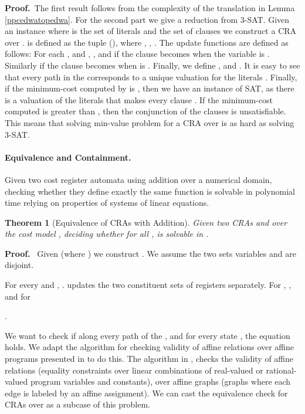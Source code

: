 \documentclass[11pt]{article}
\newtheorem{theorem}{Theorem}
\def\Proof{{\bf Proof.}}
\def\qed{{\bf }}
\def\qed{{\bf }}
\newcommand{\EDWA}{{CRA}\xspace}
\begin{document}
\Proof~The first result follows from the complexity of the translation
in Lemma \ref{ppcedwatopedwa}.  For the second part we give a
reduction from 3-SAT.  Given an instance  where  is the set of literals and  the set
of clauses we construct a \EDWA  over .  is
defined as the tuple (), where
, , . The update functions are defined as follows:
For each , and , , and
 if the clause  becomes  when
the variable  is .  Similarly  if the clause  becomes  when  is
.  Finally, we define , and .  It is easy to see that
every path in the  corresponds to a unique valuation for the
literals . Finally, if the minimum-cost computed by
 is , then we have an instance of SAT, as there is a
valuation of the literals that makes every clause . If
the minimum-cost computed is greater than , then the conjunction of
the clauses is unsatisfiable.  This means that solving min-value
problem for a \EDWA over  is as hard as solving 3-SAT.
\qed \\

\paragraph{Equivalence and Containment.} Given two cost register
automata using addition over a numerical domain, checking whether they
define exactly the same function is solvable in polynomial time
relying on properties of systems of linear equations.

\begin{theorem}[Equivalence of CRAs with Addition]\label{thm:equiv-CRA-add}
Given two CRAs  and  over the cost model ,
deciding whether for all ,  is solvable in .
\end{theorem}
\Proof~
Given  (where
) we construct . We assume the two sets variables  and
 are disjoint.

For every  and
,
.
 updates the two constituent sets of registers separately. For
,
, and for

.

We want to check if along every path of the , and for every
state , the equation 
holds.  We adapt the algorithm for checking validity of affine
relations over affine programs presented in \cite{olm_note_2004} to do
this. The algorithm in \cite{olm_note_2004}, checks the validity of
affine relations (equality constraints over linear combinations of
real-valued or rational-valued program variables and constants), over
affine graphs (graphs where each edge is labeled by an affine
assignment). We can cast the equivalence check for CRAs over  as  a subcase of this problem.
\end{document}
